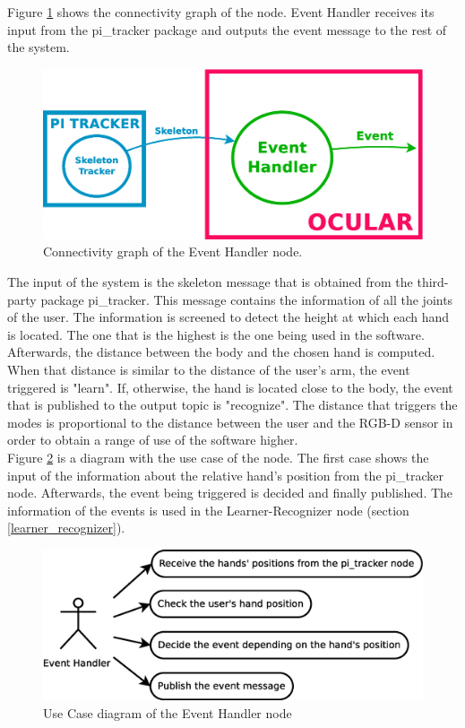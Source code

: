 	Figure \ref{node_event} shows the connectivity graph of the node. 
	Event Handler receives its input from the pi\_tracker package and outputs the event message to the rest of the system. 

		\begin{figure}[H]
			\centering
			\includegraphics[width=0.5\linewidth]{img/diagrams/node_event.eps}
			\caption[Event Handler 3D node I/O]{Connectivity graph of the Event Handler node.}		
			\label{node_event}
		\end{figure}

	The input of the system is the skeleton message that is obtained from the third-party package pi\_tracker. This message contains the information of all the joints of the user. The information is screened to detect the height at which each hand is located. The one that is the highest is the one being used in the software. Afterwards, the distance between the body and the chosen hand is computed. When that distance is similar to the distance of the user's arm, the event triggered is "learn". If, otherwise, the hand is located close to the body, the event that is published to the output topic is "recognize". 
	The distance that triggers the modes is proportional to the distance between the user and the RGB-D sensor in order to obtain a range of use of the software higher. 
	\\

	Figure \ref{uc_event} is a diagram with the use case of the node. 
	The first case shows the input of the information about the relative hand's position from the pi\_tracker node. 
	Afterwards, the event being triggered is decided and finally published. 
	The information of the events is used in the Learner-Recognizer node (section \ref{learner_recognizer}).
	\begin{figure}[H]
		\centering
			\includegraphics[scale=0.4]{img/diagrams/uc_event_handler.eps}
			\caption[Use case diagram Event Handler node]{Use Case diagram of the Event Handler node}
		\label{uc_event}
	\end{figure}

